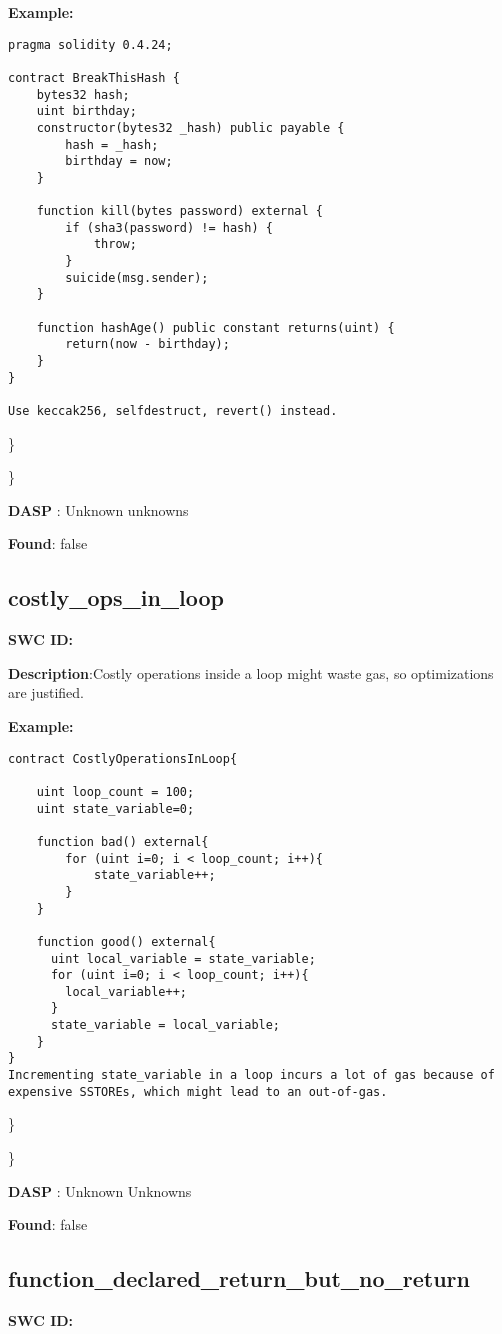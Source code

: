 \documentclass{article}
\begin{document}
\textbf{Example:} 
\begin{verbatim}
pragma solidity 0.4.24;

contract BreakThisHash {
    bytes32 hash;
    uint birthday;
    constructor(bytes32 _hash) public payable {
        hash = _hash;
        birthday = now;
    }

    function kill(bytes password) external {
        if (sha3(password) != hash) {
            throw;
        }
        suicide(msg.sender);
    }

    function hashAge() public constant returns(uint) {
        return(now - birthday);
    }
}

Use keccak256, selfdestruct, revert() instead.

\end{verbatim}\} 

\} 

\textbf{DASP} : Unknown unknowns

\textbf{Found}: false

\subsection{costly\_ops\_in\_loop} 
\textbf{SWC \textunderscore ID:} 

\textbf{Description}:Costly operations inside a loop might waste gas, so optimizations are justified.


\textbf{Example:} 
\begin{verbatim}
contract CostlyOperationsInLoop{

    uint loop_count = 100;
    uint state_variable=0;

    function bad() external{
        for (uint i=0; i < loop_count; i++){
            state_variable++;
        }
    }

    function good() external{
      uint local_variable = state_variable;
      for (uint i=0; i < loop_count; i++){
        local_variable++;
      }
      state_variable = local_variable;
    }
}
Incrementing state_variable in a loop incurs a lot of gas because of expensive SSTOREs, which might lead to an out-of-gas.

\end{verbatim}\} 

\} 

\textbf{DASP} : Unknown Unknowns

\textbf{Found}: false

\subsection{function\_declared\_return\_but\_no\_return} 
\textbf{SWC \textunderscore ID:} 
\end{document}
